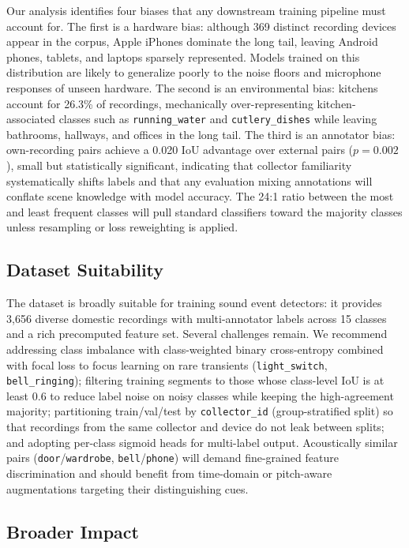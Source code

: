 \documentclass{article}
\begin{document}
Our analysis identifies four biases that any downstream training pipeline must account for. The first is a hardware bias: although 369 distinct recording devices appear in the corpus, Apple iPhones dominate the long tail, leaving Android phones, tablets, and laptops sparsely represented. Models trained on this distribution are likely to generalize poorly to the noise floors and microphone responses of unseen hardware. The second is an environmental bias: kitchens account for 26.3\% of recordings, mechanically over-representing kitchen-associated classes such as \texttt{running\_water} and \texttt{cutlery\_dishes} while leaving bathrooms, hallways, and offices in the long tail. The third is an annotator bias: own-recording pairs achieve a 0.020 IoU advantage over external pairs ($p = 0.002$), small but statistically significant, indicating that collector familiarity systematically shifts labels and that any evaluation mixing annotations will conflate scene knowledge with model accuracy. The 24:1 ratio between the most and least frequent classes will pull standard classifiers toward the majority classes unless resampling or loss reweighting is applied.

\subsection{Dataset Suitability}

The dataset is broadly suitable for training sound event detectors: it provides 3{,}656 diverse domestic recordings with multi-annotator labels across 15 classes and a rich precomputed feature set. Several challenges remain. We recommend addressing class imbalance with class-weighted binary cross-entropy combined with focal loss to focus learning on rare transients (\texttt{light\_switch}, \texttt{bell\_ringing}); filtering training segments to those whose class-level IoU is at least $0.6$ to reduce label noise on noisy classes while keeping the high-agreement majority; partitioning train/val/test by \texttt{collector\_id} (group-stratified split) so that recordings from the same collector and device do not leak between splits; and adopting per-class sigmoid heads for multi-label output. Acoustically similar pairs (\texttt{door}/\texttt{wardrobe}, \texttt{bell}/\texttt{phone}) will demand fine-grained feature discrimination and should benefit from time-domain or pitch-aware augmentations targeting their distinguishing cues.

\subsection{Broader Impact}
\end{document}
